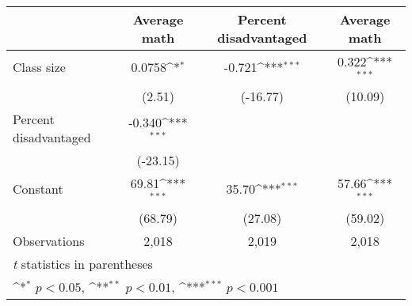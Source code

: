 {
\def\sym#1{\ifmmode^{#1}\else\(^{#1}\)\fi}
\begin{tabular}{l*{3}{c}}
\hline\hline
          &\multicolumn{1}{c}{Average math}&\multicolumn{1}{c}{Percent disadvantaged}&\multicolumn{1}{c}{Average math}\\
\hline
Class size&   0.0758\sym{*}  &   -0.721\sym{***}&    0.322\sym{***}\\
          &   (2.51)         & (-16.77)         &  (10.09)         \\
Percent disadvantaged&   -0.340\sym{***}&                  &                  \\
          & (-23.15)         &                  &                  \\
Constant  &    69.81\sym{***}&    35.70\sym{***}&    57.66\sym{***}\\
          &  (68.79)         &  (27.08)         &  (59.02)         \\
\hline
Observations&    2,018         &    2,019         &    2,018         \\
\hline\hline
\multicolumn{4}{l}{\footnotesize \textit{t} statistics in parentheses}\\
\multicolumn{4}{l}{\footnotesize \sym{*} \(p<0.05\), \sym{**} \(p<0.01\), \sym{***} \(p<0.001\)}\\
\end{tabular}
}
